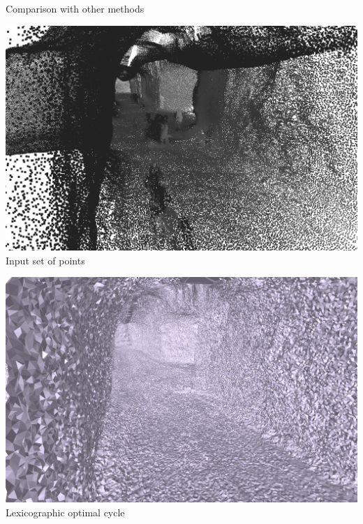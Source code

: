 \begin{frame}{Comparison with other methods}
	\scriptsize
	
	\begin{minipage}{0.5\linewidth}
		\centering
		\includegraphics[width=0.95\linewidth]{closed_points}		
		Input set of points
	\end{minipage}%
	\hfill
	\begin{minipage}{0.5\linewidth}
		\centering
		\includegraphics[width=0.95\linewidth]{closed_lex}	
		Lexicographic optimal cycle
	\end{minipage}
	

\end{frame}
